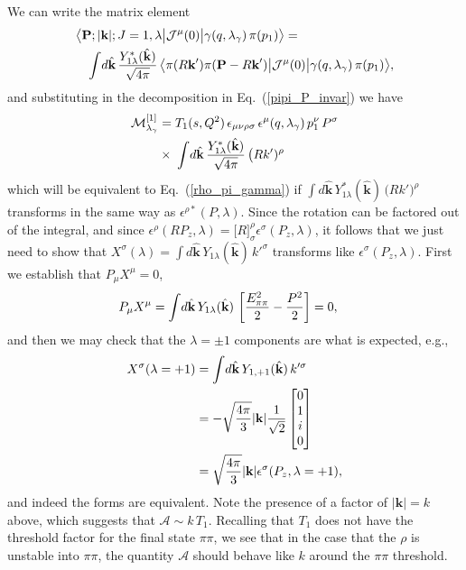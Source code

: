 {We can write the matrix element
\begin{align}
 \big\langle \textbf{P}; |\textbf{k}|; J=1, \lambda \big| {\mathcal{J}}^{\mu}(0) \big| \gamma(q, \lambda_\gamma)\, \pi(p_1) \big\rangle &=\nn\\
 &\hspace{-5.5cm} 
 \int \! d\hat{\mathbf{k}} \, \frac{Y_{1\lambda}^*(  \hat{\mathbf{k}})   }{\sqrt{4\pi}}\,  \big\langle \pi(R\textbf{k}') \pi( \textbf{P} - R\textbf{k}') \big| {\mathcal{J}}^{\mu}(0) \big| \gamma(q, \lambda_\gamma)\, \pi(p_1) \big\rangle,
\end{align}
and substituting in the decomposition in Eq.~(\ref{pipi_P_invar}) we have
\begin{align}
\mathcal{M}_{\lambda_\gamma}^{[1]}  
 &= T_1(s,Q^2)\, \epsilon_{\mu\nu\rho\sigma} \, \epsilon^\mu(q,\lambda_\gamma) \, p_1^\nu \, P^\sigma \nonumber\\
& \times\; \int \! d\hat{\mathbf{k}} \, \frac{Y_{1\lambda}^*(\hat{\mathbf{k}})}{\sqrt{4\pi}}\,\big(R k')^\rho\,
 \end{align}
which will be equivalent to Eq.~(\ref{rho_pi_gamma}) if $\int \! d\hat{\mathbf{k}} \, Y_{1\lambda}^*(\hat{\mathbf{k}})\,\big(R k')^\rho$ transforms in the same way as $\epsilon^{\rho*}(P, \lambda)$. Since the rotation can be factored out of the integral, and since $\epsilon^\rho(RP_z, \lambda) = \big[ R \big]^\rho_\sigma \epsilon^\sigma(P_z, \lambda)$, it follows that we just need to show that $X^\sigma(\lambda) = \int \! d\hat{\mathbf{k}} \, Y_{1\lambda}(\hat{\mathbf{k}})\, k'^\sigma$ transforms like $\epsilon^{\sigma}(P_z, \lambda)$. First we establish that $P_\mu X^\mu = 0$,
\begin{align}
	P_\mu X^\mu 
 	&= \int \! d\hat{\mathbf{k}} \, Y_{1\lambda}(\hat{\mathbf{k}})\, \left[ \frac{E_{\pi\pi}^2}{2}  - \frac{P^2}{2} \right] = 0,
\end{align}
and then we may check that the $\lambda=\pm 1$ components are what is expected, e.g.,
\begin{align}
	X^\sigma(\lambda = +1) &= \int \! d\hat{\mathbf{k}} \, Y_{1,+1}(\hat{\mathbf{k}})\, k'^\sigma \nonumber\\
	&= -\sqrt{\frac{4\pi}{3}} |\textbf{k}| \frac{1}{\sqrt{2}} \begin{bmatrix}
		0 \\ 1 \\ i \\ 0
	\end{bmatrix}\nonumber\\
	&= \sqrt{\frac{4\pi}{3}} |\textbf{k}| \epsilon^\sigma(P_z,\lambda=+1),
\end{align}
and indeed the forms are equivalent. Note the presence of a factor of $|\textbf{k}| = k$ above, which suggests that $\mathcal A \sim k \, T_1$. Recalling that $T_1$ does not have the threshold factor for the final state $\pi \pi$, we see that in the case that the $\rho$ is unstable into $\pi \pi$, the quantity $\mathcal A$ should behave like $k$ around the $\pi \pi$ threshold. 


}

